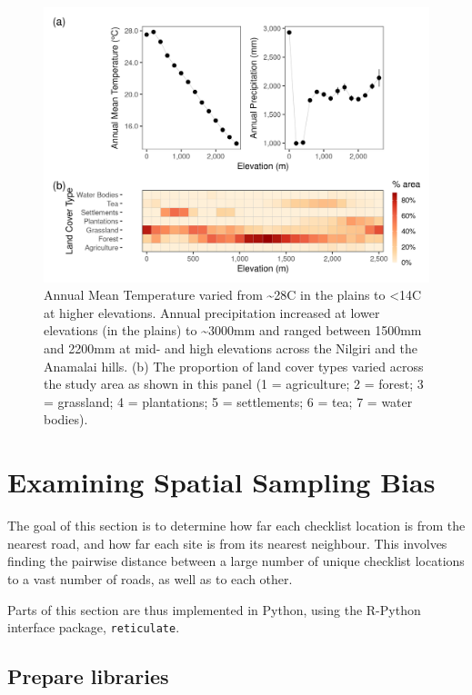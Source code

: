 \documentclass[]{article}
\begin{document}
\begin{figure}
\centering
\includegraphics{figs/fig_02_clim_lc_elev.png}
\caption{Annual Mean Temperature varied from \textasciitilde{}28C in the plains to \textless{}14C at higher elevations. Annual precipitation increased at lower elevations (in the plains) to \textasciitilde{}3000mm and ranged between 1500mm and 2200mm at mid- and high elevations across the Nilgiri and the Anamalai hills. (b) The proportion of land cover types varied across the study area as shown in this panel (1 = agriculture; 2 = forest; 3 = grassland; 4 = plantations; 5 = settlements; 6 = tea; 7 = water bodies).}
\end{figure}

\hypertarget{examining-spatial-sampling-bias}{%
\section{Examining Spatial Sampling Bias}\label{examining-spatial-sampling-bias}}

The goal of this section is to determine how far each checklist location is from the nearest road, and how far each site is from its nearest neighbour. This involves finding the pairwise distance between a large number of unique checklist locations to a vast number of roads, as well as to each other.

Parts of this section are thus implemented in Python, using the R-Python interface package, \texttt{reticulate}.

\hypertarget{prepare-libraries-1}{%
\subsection{Prepare libraries}\label{prepare-libraries-1}}
\end{document}
